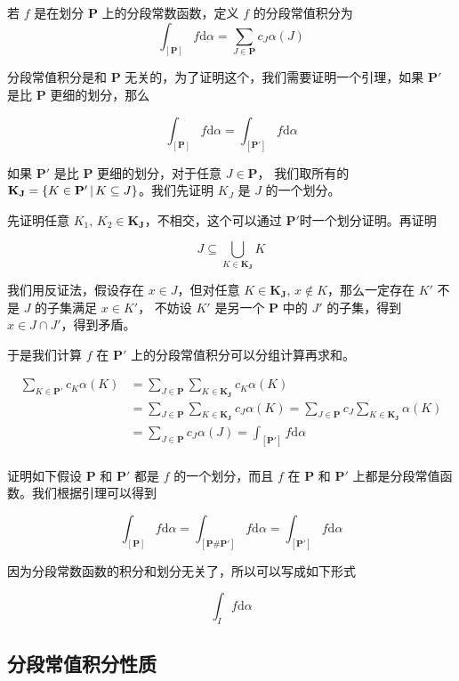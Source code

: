 若 $f$ 是在划分 $\mathbf{P}$ 上的分段常数函数，定义 $f$ 的分段常值积分为 
\[
    \int_{[\mathbf{P}]} f \mathrm{d}\alpha = \sum_{J \in \mathbf{P}}c_J \alpha(J)
\]

分段常值积分是和 $\mathbf{P}$ 无关的，为了证明这个，我们需要证明一个引理，如果 $\mathbf{P'}$ 是比 $\mathbf{P}$ 更细的划分，那么

\[
    \int_{[\mathbf{P}]} f \mathrm{d}\alpha =\int_{[\mathbf{P'}]} f\mathrm{d}\alpha
\]

如果 $\mathbf{P}'$ 是比 $\mathbf{P}$ 更细的划分，对于任意 $J \in \mathbf{P}$，
我们取所有的 $\mathbf{K_J} = \{ K \in \mathbf{P}' \,\vert\, K \subseteq J \}$。我们先证明 $K_J$ 是 $J$ 的一个划分。

先证明任意 $K_1 ,\, K_2 \in \mathbf{K_J}$，不相交，这个可以通过 $\mathbf{P}'$时一个划分证明。再证明 

\[
J \subseteq \bigcup_{K \in \mathbf{K_J}} K
\]

我们用反证法，假设存在 $x \in J$，但对任意 $K \in \mathbf{K_J},\, x \notin K$，那么一定存在 $K'$ 不是 $J$ 的子集满足 $x \in K'$，
不妨设 $K'$ 是另一个 $\mathbf{P}$ 中的 $J'$ 的子集，得到 $x \in J \cap J'$，得到矛盾。

于是我们计算 $f$ 在 $\mathbf{P'}$ 上的分段常值积分可以分组计算再求和。

\begin{align*}
\sum_{K \in \mathbf{P'}}c_K \alpha(K) &= \sum_{J \in \mathbf{P}}\sum_{K \in \mathbf{K_J}}c_K \alpha(K)  \\
&= \sum_{J \in \mathbf{P}}\sum_{K \in \mathbf{K_J}}c_J \alpha(K) = \sum_{J \in \mathbf{P}}c_J\sum_{K \in \mathbf{K_J}} \alpha(K) \\
&= \sum_{J \in \mathbf{P}}c_J \alpha(J) = \int_{[\mathbf{P}']} f \mathrm{d}\alpha\\
\end{align*}

证明如下假设 $\mathbf{P}$ 和 $\mathbf{P'}$ 都是 $f$ 的一个划分，而且 $f$ 在 $\mathbf{P}$ 和 $\mathbf{P'}$ 上都是分段常值函数。我们根据引理可以得到  

\[
    \int_{[\mathbf{P}]} f \mathrm{d}\alpha =\int_{[\mathbf{P \# P'}]} f \mathrm{d}\alpha= \int_{[\mathbf{P'}]} f \mathrm{d}\alpha
\]

因为分段常数函数的积分和划分无关了，所以可以写成如下形式

\[
\int_{I} f \mathrm{d}\alpha
\]

\subsection{分段常值积分性质}

